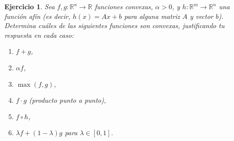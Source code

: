 \documentclass[11pt]{report}
\newtheorem{ex}{Ejercicio}
\begin{document}
\begin{ex}
  Sea \( f, g: \mathbb{R}^n \to \mathbb{R} \) funciones convexas, \( \alpha > 0 \), y \( h: \mathbb{R}^m \to \mathbb{R}^n \) una función afín (es decir, \( h(x) = Ax + b \) para alguna matriz \( A \) y vector \( b \)).
  Determina cuáles de las siguientes funciones son convexas, justificando tu respuesta en cada caso:
  \begin{enumerate}
    \item \( f + g \),
    \item \( \alpha f \),
    \item \( \max(f, g) \),
    \item \( f \cdot g \) (producto punto a punto),
    \item \( f \circ h \),
    \item \( \lambda f + (1-\lambda) g \) para \( \lambda \in [0,1] \).
  \end{enumerate}





\end{ex}
\end{document}
